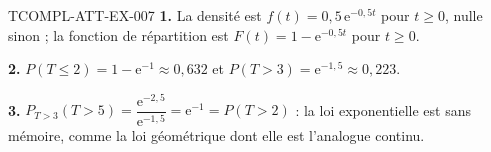 \begin{corrige}{TCOMPL-ATT-EX-007}
\textbf{1.} La densité est $f(t)=0{,}5\,\mathrm{e}^{-0{,}5t}$ pour $t\geq0$,
nulle sinon ; la fonction de répartition est
$F(t)=1-\mathrm{e}^{-0{,}5t}$ pour $t\geq0$.

\textbf{2.} $P(T\leq2)=1-\mathrm{e}^{-1}\approx0{,}632$ et
$P(T>3)=\mathrm{e}^{-1{,}5}\approx0{,}223$.

\textbf{3.} $P_{T>3}(T>5)=\dfrac{\mathrm{e}^{-2{,}5}}{\mathrm{e}^{-1{,}5}}
=\mathrm{e}^{-1}=P(T>2)$ : la loi exponentielle est sans mémoire, comme la
loi géométrique dont elle est l'analogue continu.
\end{corrige}
